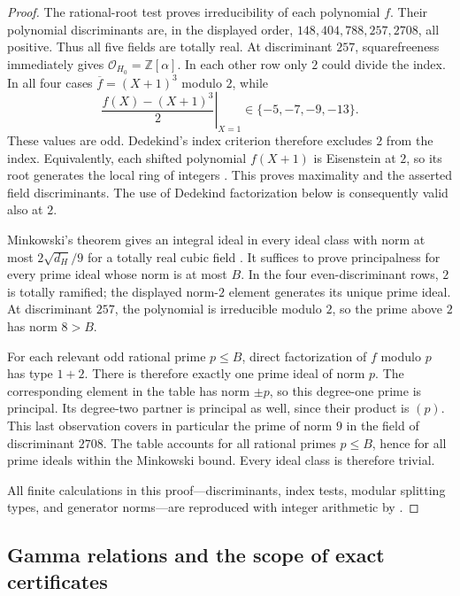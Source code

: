 \begin{proof}
The rational-root test proves irreducibility of each polynomial $f$.
Their polynomial discriminants are, in the displayed order,
$148,404,788,257,2708$, all positive.  Thus all five fields are
totally real.  At discriminant $257$, squarefreeness immediately gives
$\mathcal O_{H_0}=\mathbb Z[\alpha]$.  In each other row only $2$
could divide the index.  In all four cases
$\overline f=(X+1)^3$ modulo $2$, while
\[
 \left.\frac{f(X)-(X+1)^3}{2}\right|_{X=1}
                  \in\{-5,-7,-9,-13\}.
\]
These values are odd.  Dedekind's index criterion therefore excludes
$2$ from the index.  Equivalently, each shifted polynomial $f(X+1)$
is Eisenstein at $2$, so its root generates the local ring of integers
\cite[Proposition~7.55 and Remark~7.56]{MilneANT}.  This proves
maximality and the asserted field discriminants.  The use of Dedekind factorization below is consequently
valid also at $2$.

Minkowski's theorem gives an integral ideal in every ideal class
with norm at most $2\sqrt{d_H}/9$ for a totally real cubic field
\cite{MilneANT}.  It suffices to prove principalness for every prime
ideal whose norm is at most $B$.  In the four even-discriminant rows,
$2$ is totally ramified; the displayed norm-$2$ element generates its
unique prime ideal.  At discriminant $257$, the polynomial is
irreducible modulo $2$, so the prime above $2$ has norm $8>B$.

For each relevant odd rational prime $p\leq B$, direct factorization
of $f$ modulo $p$ has type $1+2$.  There is therefore exactly one
prime ideal of norm $p$.  The corresponding element in the table
has norm $\pm p$, so this degree-one prime is principal.  Its
degree-two partner is principal as well, since their product is
$(p)$.  This last observation covers in particular the prime of
norm $9$ in the field of discriminant $2708$.  The table accounts
for all rational primes $p\leq B$, hence for all prime ideals within
the Minkowski bound.  Every ideal class is therefore trivial.

All finite calculations in this proof---discriminants, index tests,
modular splitting types, and generator norms---are reproduced with
integer arithmetic by .
\end{proof}

\subsection{Gamma relations and the scope of exact certificates}
\label{corr:gamma-certificates}

